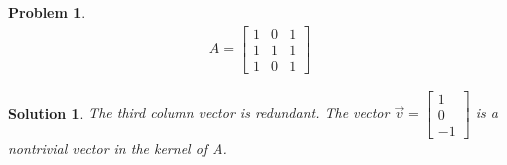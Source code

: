 \documentclass{article}
\newtheorem{problem}{Problem}
\newtheorem*{solution}{Solution}
\begin{document}
\begin{problem}
\begin{align*}
A = \begin{bmatrix}1 & 0 & 1 \\ 1 & 1 & 1 \\ 1 & 0 & 1 \end{bmatrix}
\end{align*}
\end{problem}

\begin{solution}
The third column vector is redundant. The vector $\vec{v} = \begin{bmatrix} 1 \\ 0 \\ -1 \end{bmatrix}$ is a nontrivial vector in the kernel of A.
\end{solution}
\end{document}
